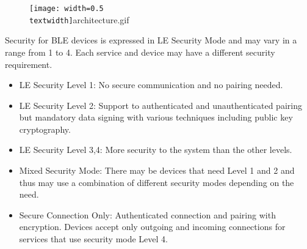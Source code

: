 \begin{figure}
	\centering	
	\texttt{[image: width=0.5\\textwidth]}{architecture.gif}
	\label{fig:architecture}
\end{figure}

Security for BLE devices is expressed in LE Security Mode and may vary in a range from 1 to 4.
Each service and device may have a different security requirement.
\begin{itemize}
	\item LE Security Level 1: No secure communication and no pairing needed.
	\item LE Security Level 2: Support to authenticated and unauthenticated pairing but mandatory data signing with various techniques including public key cryptography.
	\item LE Security Level 3,4: More security to the system than the other levels.
	\item Mixed Security Mode: There may be devices that need Level 1 and 2 and thus may use a combination of different security modes depending on the need.
	\item Secure Connection Only: Authenticated connection and pairing with encryption. Devices accept only outgoing and incoming connections for services that use security mode Level 4.
\end{itemize}


